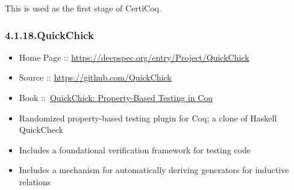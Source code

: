 \documentclass[12pt,twoside]{article}
\begin{document}
This is used as the first stage of CertiCoq.%

\subsubsection{4.1.18.\hspace*{0.5em}QuickChick}\label{sec-quickchick}%

\begin{itemize}%

\item{}
Home Page :: \href{https://deepspec.org/entry/Project/QuickChick}{{\ttfamily https://\hspace{0pt}deepspec.\hspace{0pt}org/\hspace{0pt}entry/\hspace{0pt}Project/\hspace{0pt}QuickChick}}%

\item{}
Source :: \href{https://github.com/QuickChick}{{\ttfamily https://\hspace{0pt}github.\hspace{0pt}com/\hspace{0pt}QuickChick}}%

\item{}
Book ::~\href{https://softwarefoundations.cis.upenn.edu/qc-current}{QuickChick: Property-Based Testing in Coq}%

\item{}
Randomized property-based testing plugin for Coq; a clone of Haskell QuickCheck%

\item{}
Includes a foundational verification framework for testing code%

\item{}
Includes a mechanism for automatically deriving generators for inductive relations%
\end{itemize}%
\end{document}
